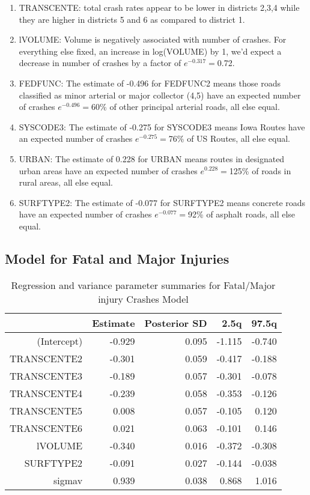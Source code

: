 \documentclass[a4paper]{article}\usepackage[]{graphicx}\usepackage[]{color}
\begin{document}
\begin{enumerate}
\item
TRANSCENTE: total crash rates appear to be lower in districts 2,3,4 while they are higher in districts 5 and 6 as compared to district 1. 

\item
lVOLUME: Volume is negatively associated with number of crashes. For everything else fixed, an increase in log(VOLUME) by 1, we'd expect a decrease in number of crashes by a factor of $e^{-0.317}=$0.72.

\item
FEDFUNC: The estimate of -0.496 for FEDFUNC2 means those roads classified as minor arterial or major collector (4,5) have an expected number of crashes $e^{-0.496}=$60\% of other principal arterial roads, all else equal. 

\item
SYSCODE3: The estimate of -0.275 for SYSCODE3 means Iowa Routes have an expected number of crashes $e^{-0.275}=$76\% of US Routes, all else equal.

\item
URBAN: The estimate of 0.228 for URBAN means routes in designated urban areas have an expected number of crashes $e^{0.228}=$125\% of roads in rural areas, all else equal.

\item
SURFTYPE2: The estimate of -0.077 for SURFTYPE2 means concrete roads have an expected number of crashes $e^{-0.077}=$92\% of asphalt roads, all else equal.

\end{enumerate}

\clearpage
\subsection{Model for Fatal and Major Injuries}


\begin{table}[h!]
\centering
\begin{tabular}{rrrrr}
  \hline
 & Estimate & Posterior SD & 2.5q & 97.5q \\ 
  \hline
(Intercept) & -0.929 & 0.095 & -1.115 & -0.740 \\ 
  TRANSCENTE2 & -0.301 & 0.059 & -0.417 & -0.188 \\ 
  TRANSCENTE3 & -0.189 & 0.057 & -0.301 & -0.078 \\ 
  TRANSCENTE4 & -0.239 & 0.058 & -0.353 & -0.126 \\ 
  TRANSCENTE5 & 0.008 & 0.057 & -0.105 & 0.120 \\ 
  TRANSCENTE6 & 0.021 & 0.063 & -0.101 & 0.146 \\ 
  lVOLUME & -0.340 & 0.016 & -0.372 & -0.308 \\ 
  SURFTYPE2 & -0.091 & 0.027 & -0.144 & -0.038 \\ 
  sigmav & 0.939 & 0.038 & 0.868 & 1.016 \\ 
   \hline
\end{tabular}
\caption{Regression and variance parameter summaries for Fatal/Major injury Crashes Model} 
\label{fatmajcrash}
\end{table}
\end{document}
